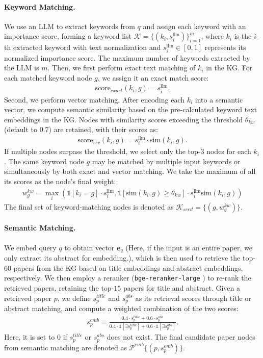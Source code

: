 \documentclass{llmxive}
\begin{document}
\paragraph{Keyword Matching.}
We use an LLM to extract keywords from $q$ and assign each keyword with an importance score, forming a keyword list $\mathcal{K}=\{(k_i, s_i^\text{llm})\}_{i=1}^m$, where $k_i$ is the $i$-th extracted keyword with text normalization and $s_i^\text{llm} \in [0, 1]$ represents its normalized importance score.
The maximum number of keywords extracted by the LLM is $m$.
Then, we first perform exact text matching of $k_i$ in the KG.
For each matched keyword node $g$, we assign it an exact match score:
\begin{align}
    \text{score}_{exact}(k_i, g)=s_i^\text{llm}.
\end{align}
Second, we perform vector matching.
After encoding each $k_i$ into a semantic vector, we compute semantic similarity based on the pre-calculated keyword text embeddings in the KG.
Nodes with similarity scores exceeding the threshold $\theta_{kw}$ (default to $0.7$) are retained, with their scores as:
\begin{align}
    \text{score}_{vec}(k_i, g)=s_i^\text{llm}\cdot\text{sim}(k_i, g).
\end{align}
If multiple nodes surpass the threshold, we select only the top-3 nodes for each $k_i$.
The same keyword node $g$ may be matched by multiple input keywords or simultaneously by both exact and vector matching.
We take the maximum of all its scores as the node's final weight:
\begin{align}
    w_g^{kw}=\max_i \left( \mathbb{1}[k_i=g]\cdot s_i^\text{llm}, \mathbb{1}[\text{sim}(k_i,g)\ge \theta_{kw}]\cdot s_i^\text{llm}\text{sim}(k_i, g)\right)
\end{align}
The final set of keyword-matching nodes is denoted as $\mathcal{K}_{seed}=\{(g, w_g^{kw})\}$.

\paragraph{Semantic Matching.}
We embed query $q$ to obtain vector $\mathbf{e}_q$ (Here, if the input is an entire paper, we only extract its abstract for embedding.), which is then used to retrieve the top-$60$ papers from the KG based on title embeddings and abstract embeddings, respectively.
We then employ a reranker (\texttt{bge-reranker-large} \citep{bge}) to re-rank the retrieved papers, retaining the top-$15$ papers for title and abstract.
Given a retrieved paper $p$, we define $s_p^{title}$ and $s_p^{abs}$ as its retrieval scores through title or abstract matching, and compute a weighted combination of the two scores:
\begin{align}
\label{eq:weighted}
    s_p^{emb}=\frac{0.4\cdot s_p^{title}+0.6\cdot s_p^{abs}}{0.4\cdot \mathbb{1}[\exists s_p^{title}]+0.6\cdot \mathbb{1}[\exists s_p^{abs}]}.
\end{align}
Here, it is set to $0$ if $s_p^{title}$ or $s_p^{abs}$ does not exist.
The final candidate paper nodes from semantic matching are denoted as $\mathcal{P}^{emb}\{(p, s_p^{emb})\}$.
\end{document}
